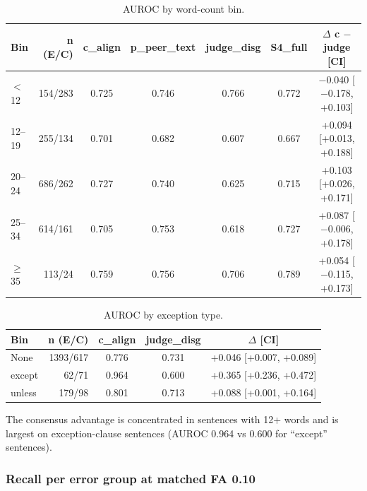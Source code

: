 \documentclass[11pt,letterpaper]{article}
\begin{document}
\begin{table}[!htbp]
\centering
\caption{AUROC by word-count bin.}
\label{tab:auroc_words}
\small
\begin{tabular}{lrccccc}
\toprule
Bin & n (E/C) & c\_align & p\_peer\_text & judge\_disg & S4\_full & $\Delta$ c $-$ judge [CI] \\
\midrule
$<$12 & 154/283 & 0.725 & 0.746 & 0.766 & 0.772 & $-$0.040 [$-$0.178, +0.103] \\
12--19 & 255/134 & 0.701 & 0.682 & 0.607 & 0.667 & +0.094 [+0.013, +0.188] \\
20--24 & 686/262 & 0.727 & 0.740 & 0.625 & 0.715 & +0.103 [+0.026, +0.171] \\
25--34 & 614/161 & 0.705 & 0.753 & 0.618 & 0.727 & +0.087 [$-$0.006, +0.178] \\
$\geq$35 & 113/24 & 0.759 & 0.756 & 0.706 & 0.789 & +0.054 [$-$0.115, +0.173] \\
\bottomrule
\end{tabular}
\end{table}

\begin{table}[!htbp]
\centering
\caption{AUROC by exception type.}
\label{tab:auroc_exception}
\begin{tabular}{lrccc}
\toprule
Bin & n (E/C) & c\_align & judge\_disg & $\Delta$ [CI] \\
\midrule
None & 1393/617 & 0.776 & 0.731 & +0.046 [+0.007, +0.089] \\
except & 62/71 & 0.964 & 0.600 & +0.365 [+0.236, +0.472] \\
unless & 179/98 & 0.801 & 0.713 & +0.088 [+0.001, +0.164] \\
\bottomrule
\end{tabular}
\end{table}

The consensus advantage is concentrated in sentences with 12+ words and is largest on exception-clause
sentences (AUROC 0.964 vs 0.600 for ``except'' sentences).

\subsubsection{Recall per error group at matched FA 0.10}
\end{document}
